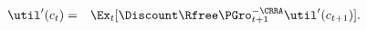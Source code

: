 \begin{eqnarray}
        \util^{\prime}({c}_{t}) & = & \Ex_{t}[\Discount\Rfree \PGro_{t+1}^{-\CRRA}\util^{\prime}({c}_{t+1})]. \label{eq:cEuler}
\end{eqnarray}
